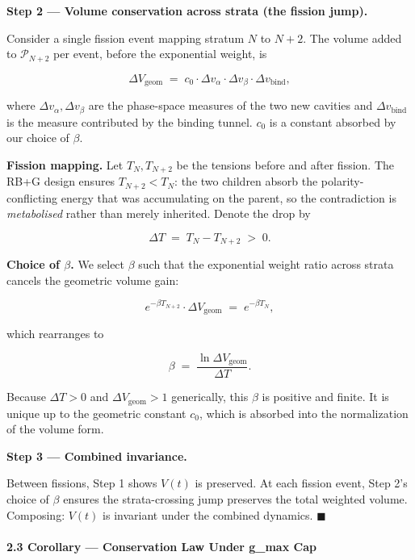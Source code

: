 \documentclass[
  11pt,
  a4paper,
]{article}
\begin{document}
\textbf{Step 2 --- Volume conservation across strata (the fission
jump).}

Consider a single fission event mapping stratum \(N\) to \(N+2\). The
volume added to \(\mathcal{P}_{N+2}\) per event, before the exponential
weight, is

\[
\Delta V_\text{geom} \;=\; c_0 \cdot \Delta v_\alpha \cdot \Delta v_\beta \cdot \Delta v_\text{bind},
\]

where \(\Delta v_\alpha, \Delta v_\beta\) are the phase-space measures
of the two new cavities and \(\Delta v_\text{bind}\) is the measure
contributed by the binding tunnel. \(c_0\) is a constant absorbed by our
choice of \(\beta\).

\textbf{Fission mapping.} Let \(T_N, T_{N+2}\) be the tensions before
and after fission. The RB+G design ensures \(T_{N+2} < T_N\): the two
children absorb the polarity-conflicting energy that was accumulating on
the parent, so the contradiction is \emph{metabolised} rather than
merely inherited. Denote the drop by

\[
\Delta T \;=\; T_N - T_{N+2} \;>\; 0.
\]

\textbf{Choice of \(\beta\).} We select \(\beta\) such that the
exponential weight ratio across strata cancels the geometric volume
gain:

\[
e^{-\beta T_{N+2}} \cdot \Delta V_\text{geom} \;=\; e^{-\beta T_N},
\]

which rearranges to

\[
\boxed{\;\beta \;=\; \frac{\ln \Delta V_\text{geom}}{\Delta T}. \;}
\]

Because \(\Delta T > 0\) and \(\Delta V_\text{geom} > 1\) generically,
this \(\beta\) is positive and finite. It is unique up to the geometric
constant \(c_0\), which is absorbed into the normalization of the volume
form.

\textbf{Step 3 --- Combined invariance.}

Between fissions, Step 1 shows \(V(t)\) is preserved. At each fission
event, Step 2's choice of \(\beta\) ensures the strata-crossing jump
preserves the total weighted volume. Composing: \(V(t)\) is invariant
under the combined dynamics. \(\blacksquare\)

\paragraph{2.3 Corollary --- Conservation Law Under g\_max
Cap}\label{corollary-conservation-law-under-g_max-cap}
\end{document}

